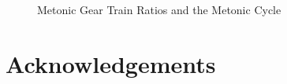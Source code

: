 \documentclass[11pt, oneside]{article}   	%
\theoremstyle{definition}
\begin{document}
\bigskip
\begin{figure}[H]
\caption{Metonic Gear Train Ratios and the Metonic Cycle}
\label{fig:metonic_gear_ratios}
\end{figure}

\bigskip
\section{Acknowledgements}

\newpage


\end{document}
